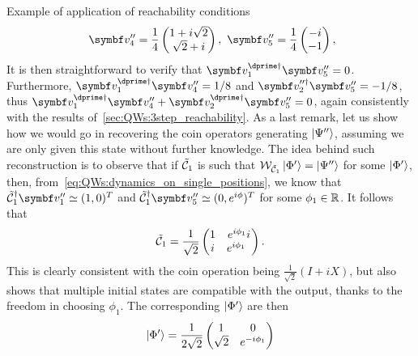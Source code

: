 \begin{examplebox}[label=ex:QWs:conditions_few_steps]{Example of application of reachability conditions}
\begin{equation}
\begin{aligned}
        \,\,
        \bs v''_4 = \frac{1}{4}\begin{pmatrix} 1 + i\sqrt2\\ \sqrt2 + i \end{pmatrix},
        \,\,
        \bs v''_5 = \frac{1}{4}\begin{pmatrix} -i \\ -1 \end{pmatrix},
    \end{aligned}
    \end{equation}
    It is then straightforward to verify that
    $\bs v_1^{\dprime\dagger}\bs v_5'' = 0$.
    Furthermore,
    $\bs v_1^{\dprime\dagger}\bs v_4'' = 1/8$
    and $\bs v_2^{\prime\prime\dagger}\bs v_5'' = -1/8$,
    thus 
    $\bs v_1^{\dprime\dagger}\bs v_4'' + \bs v_2^{\dprime\dagger}\bs v_5'' = 0$,
    again consistently with the results of~\cref{sec:QWs:3step_reachability}.
    As a last remark, let us show how we would go in recovering the coin operators generating $\ket{\Psi''}$, assuming we are only given this state without further knowledge.
    The idea behind such reconstruction is to observe that if $\tilde{{\mathcal{C}}}_1$ is such that ${\mathcal{W}}_{\tilde{{\mathcal{C}}}_1}\ket{\Phi'}=\ket{\Psi''}$ for some $\ket{\Phi'}$, then, from~\cref{eq:QWs:dynamics_on_single_positions}, we know that $\tilde\calC_1^\dagger \bs v_1''\simeq(1,0)^T$ and $\tilde\calC_1^\dagger \bs v_5''\simeq(0,e^{i\phi})^T$ for some $\phi_1\in{\mathbb{R}}$. It follows that
    \begin{equation}
        \tilde{{\mathcal{C}}}_1 =
        \frac{1}{\sqrt2} \begin{pmatrix}
            1 & e^{i\phi_1}i \\
            i & e^{i\phi_1}\phantom{1}
        \end{pmatrix}.
    \end{equation}
    This is clearly consistent with the coin operation being $\frac{1}{\sqrt2}(I+iX)$, but also shows that multiple initial states are compatible with the output, thanks to the freedom in choosing $\phi_1$. The corresponding $\ket{\Phi'}$ are then
    \begin{equation}
        \ket{\Phi'} = \frac{1}{2\sqrt2}
        \begin{pmatrix}
            1 & 0 \\
            \sqrt2 & e^{-i\phi_1} \\

\end{pmatrix}
\end{equation}
\end{examplebox}
